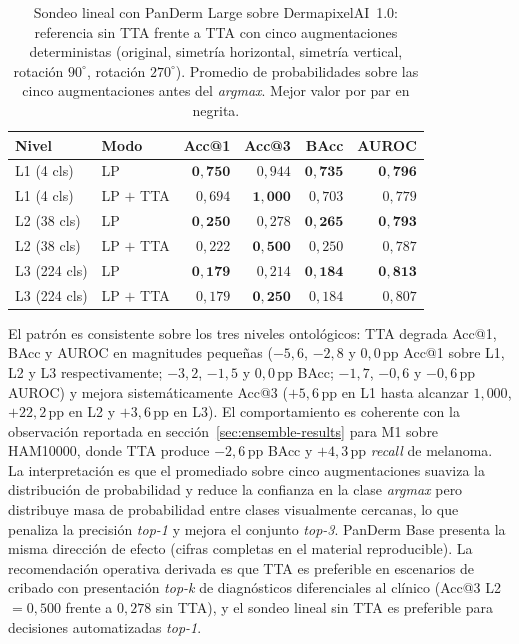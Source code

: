 \begin{table}[H]
\centering
\footnotesize
\setlength{\tabcolsep}{4pt}
\renewcommand{\arraystretch}{0.95}
\caption{Sondeo lineal con PanDerm Large sobre DermapixelAI~1.0:
referencia sin TTA frente a TTA con cinco augmentaciones
deterministas (original, simetría horizontal, simetría vertical,
rotación $90^\circ$, rotación $270^\circ$). Promedio de
probabilidades sobre las cinco augmentaciones antes del
\emph{argmax}. Mejor valor por par en negrita.}
\label{tab:dermapixel-tta}
\begin{tabular}{llrrrr}
\hline
Nivel & Modo & Acc@1 & Acc@3 & BAcc & AUROC \\
\hline
L1 (4 cls)   & LP                & $\mathbf{0{,}750}$ & $0{,}944$          & $\mathbf{0{,}735}$ & $\mathbf{0{,}796}$ \\
L1 (4 cls)   & LP $+$ TTA        & $0{,}694$          & $\mathbf{1{,}000}$ & $0{,}703$          & $0{,}779$ \\
L2 (38 cls)  & LP                & $\mathbf{0{,}250}$ & $0{,}278$          & $\mathbf{0{,}265}$ & $\mathbf{0{,}793}$ \\
L2 (38 cls)  & LP $+$ TTA        & $0{,}222$          & $\mathbf{0{,}500}$ & $0{,}250$          & $0{,}787$ \\
L3 (224 cls) & LP                & $\mathbf{0{,}179}$ & $0{,}214$          & $\mathbf{0{,}184}$ & $\mathbf{0{,}813}$ \\
L3 (224 cls) & LP $+$ TTA        & $0{,}179$          & $\mathbf{0{,}250}$ & $0{,}184$          & $0{,}807$ \\
\hline
\end{tabular}
\end{table}

El patrón es consistente sobre los tres niveles ontológicos: TTA
degrada Acc@1, BAcc y AUROC en magnitudes pequeñas ($-5{,}6$,
$-2{,}8$ y $0{,}0$\,pp Acc@1 sobre L1, L2 y L3 respectivamente;
$-3{,}2$, $-1{,}5$ y $0{,}0$\,pp BAcc; $-1{,}7$, $-0{,}6$ y
$-0{,}6$\,pp AUROC) y mejora sistemáticamente Acc@3
($+5{,}6$\,pp en L1 hasta alcanzar $1{,}000$, $+22{,}2$\,pp en
L2 y $+3{,}6$\,pp en L3). El comportamiento es coherente con la
observación reportada en secci\'on~\ref{sec:ensemble-results} para
M1 sobre HAM10000, donde TTA produce $-2{,}6$\,pp BAcc y
$+4{,}3$\,pp \emph{recall} de melanoma. La interpretación es que el
promediado sobre cinco augmentaciones suaviza la distribución de
probabilidad y reduce la confianza en la clase \emph{argmax} pero
distribuye masa de probabilidad entre clases visualmente cercanas,
lo que penaliza la precisión \emph{top-1} y mejora el conjunto
\emph{top-3}. PanDerm Base presenta la misma dirección de efecto
(cifras completas en el material reproducible). La recomendación
operativa derivada es que TTA es preferible en escenarios de cribado
con presentación \emph{top-k} de diagnósticos diferenciales al
clínico (Acc@3 L2 $= 0{,}500$ frente a $0{,}278$ sin TTA), y el
sondeo lineal sin TTA es preferible para decisiones automatizadas
\emph{top-1}.

